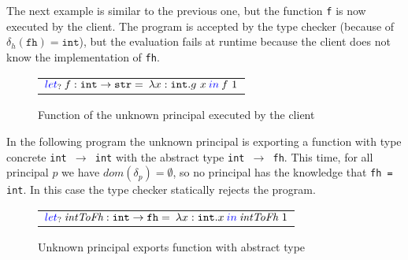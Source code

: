 \documentclass{article}
\newcommand{\plet}[5]{\textcolor[rgb]{0,0,1}{let}_{#1} \: {#2}:{#3} = \: #4 \: \textcolor[rgb]{0,0,1}{in} \: #5}
\newcommand\icode[1]{\texttt{#1}}
\begin{document}
The next example is similar to the previous one, but the function \icode{f} is now executed by the client. The program is accepted by the type checker (because of $\delta_h(\icode{fh}) = \icode{int}$), but the evaluation fails at runtime because the client does not know the implementation of \icode{fh}.
\begin{figure}[!htbp]
\begin{center}
\begin{tabular}{l}
$\plet{?}{f}{\icode{int} \rightarrow \icode{str}}{\lambda x: \icode{int}.g~x}{f~1}$ 
\end{tabular}
\end{center}
\vspace*{-5mm}
\caption{Function of the unknown principal executed by the client}%
\label{fig:gradual-motivation-2}%
\end{figure}

In the following program the unknown principal is exporting a function with type concrete \icode{int $\rightarrow$ int} with the abstract type \icode{int $\rightarrow$ fh}. This time, for all principal $p$ we have $dom(\delta_p)=\emptyset$, so no principal has the knowledge that \icode{fh = int}. In this case the type checker statically rejects the program.
\begin{figure}[!htbp]
\begin{center}
\begin{tabular}{l}
$\plet{?}{\textit{intToFh}}{\icode{int} \rightarrow \icode{fh}}{\lambda x: \icode{int}.x}{\textit{intToFh}~1}$
\end{tabular}
\end{center}
\vspace*{-5mm}
\caption{Unknown principal exports function with abstract type}%
\label{fig:gradual-motivation-3}%
\end{figure}
\end{document}
